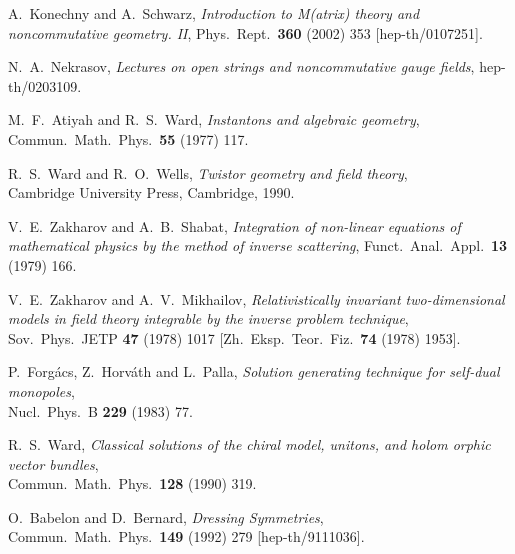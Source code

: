\documentclass[a4paper,11pt,english]{article}
\numberwithin{equation}{section}
\renewcommand{\=}{\ =\ }
\begin{document}
\begin{thebibliography}{99}
         A.~Konechny and A.~Schwarz,
         {\em Introduction to M(atrix) theory and noncommutative geometry. II},
         Phys.\ Rept.\  {\bf 360} (2002) 353
         [hep-th/0107251].

         N.~A.~Nekrasov,
         {\em Lectures on open strings and noncommutative gauge fields},
         hep-th/0203109.

         M.~F.~Atiyah and R.~S.~Ward,
         {\em Instantons and algebraic geometry},\\
         Commun.\ Math.\ Phys.\  {\bf 55} (1977) 117.

         R.~S.~Ward and R.~O.~Wells,
         {\em Twistor geometry and field theory},\\
         Cambridge University Press, Cambridge, 1990.

         V.~E.~Zakharov and A.~B.~Shabat,
         {\em Integration of non-linear equations of mathematical physics %
 by the method of inverse scattering},
         Funct.\ Anal.\ Appl.\ {\bf 13} (1979) 166.

         V.~E.~Zakharov and A.~V.~Mikhailov,
         {\em Relativistically invariant two-dimensional models in field %
theory integrable by the inverse problem technique},\\
         Sov.\ Phys.\ JETP {\bf 47} (1978) 1017
         [Zh.\ Eksp.\ Teor.\ Fiz.\  {\bf 74} (1978) 1953].

         P.~Forg\'acs, Z.~Horv\'ath and L.~Palla,
         {\em Solution generating technique for self-dual monopoles},\\
         Nucl.\ Phys.\ B {\bf 229} (1983) 77.

         R.~S.~Ward,
         {\em Classical solutions of the chiral model, unitons, and holom%
orphic vector bundles},\\
         Commun.\ Math.\ Phys.\  {\bf 128} (1990) 319.

	 O.~Babelon and D.~Bernard,
	 {\em Dressing Symmetries},\\
	 Commun.\ Math.\ Phys.\  {\bf 149} (1992) 279
	 [hep-th/9111036].


\end{thebibliography}
\end{document}
